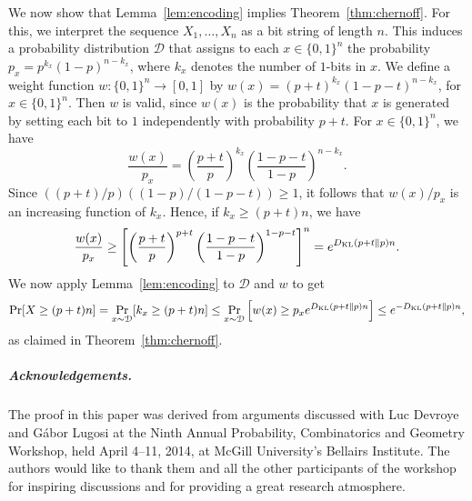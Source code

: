 \documentclass[a4paper,english,numberwithinsect]{oasics-v2016}
\newcommand{\DKL}{D_\textup{KL}}
\begin{document}
We now show that Lemma~\ref{lem:encoding} 
implies Theorem~\ref{thm:chernoff}. 
For this, we interpret the sequence $X_1, \dots, X_n$
as a bit string of length $n$. This induces a probability distribution 
$\mathcal{D}$ that assigns to each $x \in \{0, 1\}^n$ the 
probability 
$p_x = p^{k_x} (1-p)^{n-k_x}$, where $k_x$ denotes the number of
$1$-bits in $x$.
We define a weight function $w : \{0,1\}^n \rightarrow [0,1]$ by
$w(x) = (p+t)^{k_x}(1-p-t)^{n-k_x}$, for 
$x \in \{0,1\}^n$.
Then $w$ is valid, since $w(x)$ is the
probability that $x$ is generated by setting each bit 
to $1$ independently with probability $p+t$.
For $x \in \{0,1\}^n$, 
we have
\[
\frac{w(x)}{p_x}
=
\left(\frac{p+t}{p}\right)^{k_x}
\left(\frac{1-p-t}{1-p}\right)^{n - k_x}. 
\]
Since $((p+t)/p)((1-p)/(1-p-t)) \geq 1$, it follows
that $w(x)/p_x$ is an increasing function of $k_x$.
Hence, if $k_x \geq (p + t)n$, we have
\[
\frac{w(x)}{p_x}
\geq
\left[\left(\frac{p+t}{p}\right)^{p+t}
\left(\frac{1-p-t}{1-p}\right)^{1 - p-t}\right]^n
= e^{\DKL(p+t \| p)n}.
\]
We now apply Lemma~\ref{lem:encoding} to $\mathcal{D}$ and $w$ to get
\[
\Pr[X \geq (p+t)n] = \Pr_{x\sim \mathcal{D}} [ k_x \geq (p+t)n]
\leq \Pr_{x \sim \mathcal{D}} \left[ w(x) \geq 
p_xe^{\DKL(p+t \| p)n}\right]
    \leq e^{-\DKL(p+t \| p)n},
\]
as claimed in Theorem~\ref{thm:chernoff}.

\subparagraph*{Acknowledgements.}
The proof in this paper was derived 
from arguments discussed with Luc Devroye and
G\'abor Lugosi at the
Ninth Annual Probability, Combinatorics
and Geometry Workshop, held April 4--11, 2014, at McGill University's
Bellairs Institute. The authors would like to thank them and
all the other participants of the workshop for inspiring discussions
and for providing a great research atmosphere.





\end{document}
